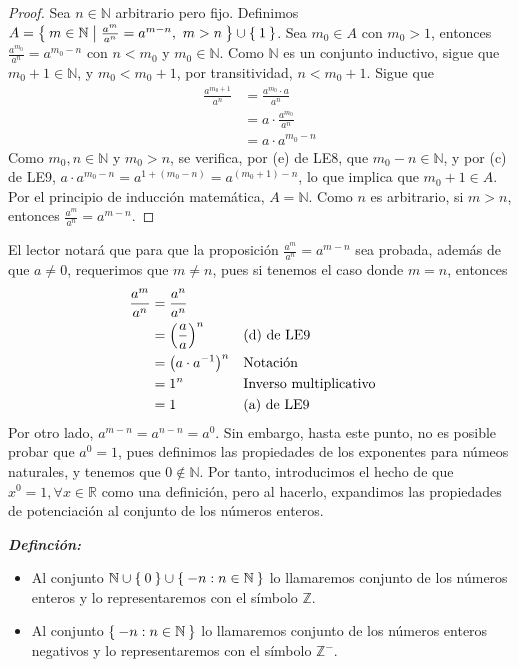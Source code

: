 \documentclass[11pt]{article}
\newcommand{\N}{\mathbb{N}}
\newcommand{\Z}{\mathbb{Z}}
\newcommand{\R}{\mathbb{R}}
\newcommand{\bfit}[1]{\textbf{\textit{#1}}}
\let\set\Set
\let\union\cup
\begin{document}
 \begin{proof}
   Sea $n\in \N$ arbitrario pero fijo. Definimos $A=\set{m \in \N|\frac{a^m}{a^n}=a^{m-n}, \ m>n}\union\set{1}$. 
   Sea $m_0 \in A$ con $m_0>1$, entonces $\frac{a^{m_0}}{a^n} = a^{m_0-n}$ con $n<m_0$ y $m_0\in \N$. Como $\N$ es un conjunto inductivo, sigue que $m_0+1\in \N$, y $m_0<m_0+1$, por transitividad, $n<m_0+1$. Sigue que \begin{align*}
    \frac{a^{m_0+1}}{a^n} &= \frac{a^{m_0}\cdot a}{a^n}\\
    &= a\cdot \frac{a^{m_0}}{a^n}\\
    &= a\cdot a^{m_0-n}
   \end{align*}
   Como $m_0,n \in \N$ y $m_0>n$, se verifica, por (e) de LE8, que $m_0-n\in \N$, y por (c) de LE9, $a\cdot a^{m_0-n} = a^{1+(m_0-n)} = a^{(m_0+1)-n}$, lo que implica que $m_0+1 \in A$. Por el principio de inducción matemática, $A=\N$. Como $n$ es arbitrario, si $m>n$, entonces $\frac{a^m}{a^n} = a^{m-n}$.
 \end{proof}

 El lector notará que para que la proposición $\frac{a^m}{a^n} = a^{m-n}$ sea probada, además de que $a\neq 0$, requerimos que $m\neq n$, pues si tenemos el caso donde $m=n$, entonces \begin{align*}
  \frac{a^m}{a^n} &= \frac{a^n}{a^n}\\
  &= \qty(\frac{a}{a})^n && \text{(d) de LE9}\\
  &= \bigl(a\cdot a^{-1}\bigr)^n && \text{Notación}\\
  &= 1^n && \text{Inverso multiplicativo}\\
  &= 1 && \text{(a) de LE9}
\end{align*}
Por otro lado, $a^{m-n} = a^{n-n} = a^0$. Sin embargo, hasta este punto, no es posible probar que $a^0 = 1$, pues definimos las propiedades de los exponentes para númeos naturales, y tenemos que $0\notin \N$. Por tanto, introducimos el hecho de que $x^0 = 1, \forall x\in \R$ como una definición, pero al hacerlo, expandimos las propiedades de potenciación al conjunto de los números enteros.

  \bfit{Definción:} \begin{itemize}
    \item Al conjunto $\N \cup \set{0} \cup \set{-n: n\in \N}$ lo llamaremos conjunto de los números enteros y lo representaremos con el símbolo $\Z$.
    \item Al conjunto $\set{-n: n\in \N}$ lo llamaremos conjunto de los números enteros negativos y lo representaremos con el símbolo $\Z^-$.
   \end{itemize}
   
\end{document}
